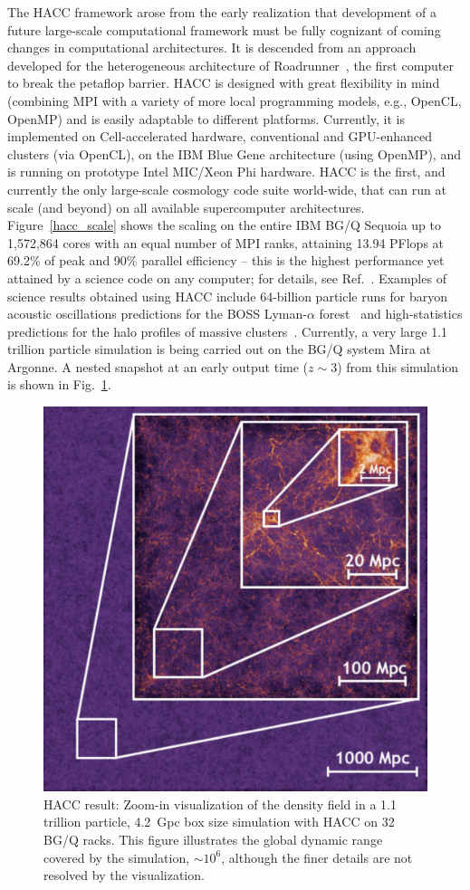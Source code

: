 The HACC framework arose from the early realization that development
of a future large-scale computational framework must be fully
cognizant of coming changes in computational architectures. It is
descended from an approach developed for the heterogeneous
architecture of Roadrunner~\cite{mc3,pope10}, the first computer to
break the petaflop barrier. HACC is designed with
great flexibility in mind (combining MPI with a variety of more local
programming models, e.g., OpenCL, OpenMP) and is easily adaptable to
different platforms. Currently, it is implemented on Cell-accelerated
hardware, conventional and GPU-enhanced clusters (via OpenCL), on the
IBM Blue Gene architecture (using OpenMP), and is running on prototype
Intel MIC/Xeon Phi hardware. HACC is the first, and currently the only
large-scale cosmology code suite world-wide, that can run at scale
(and beyond) on all available supercomputer
architectures. Figure~\ref{hacc_scale} shows the scaling on the entire
IBM BG/Q Sequoia up to 1,572,864 cores with an equal number of MPI
ranks, attaining 13.94 PFlops at 69.2\% of peak and 90\% parallel
efficiency -- this is the highest performance yet attained by a
science code on any computer; for details, see
Ref.~\cite{habib12}. Examples of science results obtained using HACC
include 64-billion particle runs for baryon acoustic oscillations
predictions for the BOSS Lyman-$\alpha$ forest~\cite{boss_bao} and
high-statistics predictions for the halo profiles of massive
clusters~\cite{conc_hacc}. Currently, a very large 1.1 trillion
particle simulation is being carried out on the BG/Q system Mira at
Argonne.  A nested snapshot at an early output time ($z\sim3$) from
this simulation is shown in Fig.~\ref{simpic}.

\begin{figure}
  \centering \includegraphics[width=0.5\columnwidth]{../Plots/zoom_in}
\caption{HACC result: Zoom-in visualization of the density
    field in a 1.1 trillion particle, 4.2~Gpc box size simulation with
    HACC on 32 BG/Q racks.  This figure illustrates the global
    dynamic range covered by the simulation, $\sim 10^6$, although the
    finer details are not resolved by the visualization.}
\label{simpic}
\end{figure}



